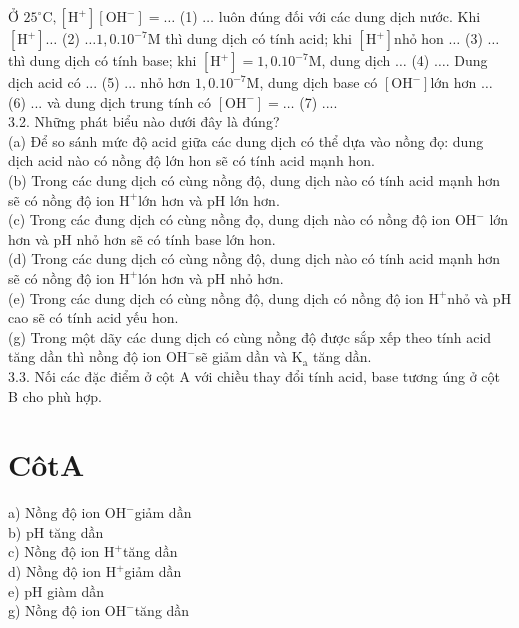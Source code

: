 \documentclass[10pt]{article}
\begin{document}
Ở $25^{\circ} \mathrm{C},\left[\mathrm{H}^{+}\right]\left[\mathrm{OH}^{-}\right]=\ldots$ (1) $\ldots$ luôn đúng đối với các dung dịch nước. Khi $\left[\mathrm{H}^{+}\right] \ldots$ (2) $\ldots 1,0.10^{-7} \mathrm{M}$ thì dung dịch có tính acid; khi $\left[\mathrm{H}^{+}\right]$nhỏ hon $\ldots$ (3) $\ldots$ thì dung dịch có tính base; khi $\left[\mathrm{H}^{+}\right]=1,0.10^{-7} \mathrm{M}$, dung dịch $\ldots$ (4) $\ldots$. Dung dịch acid có ... (5) ... nhỏ hơn $1,0.10^{-7} \mathrm{M}$, dung dịch base có $\left[\mathrm{OH}^{-}\right]$lớn hơn $\ldots$ (6) ... và dung dịch trung tính có $\left[\mathrm{OH}^{-}\right]=\ldots$ (7) ....\\
3.2. Những phát biểu nào dưới đây là đúng?\\
(a) Để so sánh mức độ acid giữa các dung dịch có thể dựa vào nồng đọ: dung dịch acid nào có nồng độ lớn hon sẽ có tính acid mạnh hon.\\
(b) Trong các dung dịch có cùng nồng độ, dung dịch nào có tính acid mạnh hơn sẽ có nồng độ ion $\mathrm{H}^{+}$lớn hơn và pH lớn hơn.\\
(c) Trong các đung dịch có cùng nồng đọ, dung dịch nào có nồng độ ion $\mathrm{OH}^{-}$ lớn hơn và pH nhỏ hơn sẽ có tính base lớn hon.\\
(d) Trong các dung dịch có cùng nồng độ, dung dịch nào có tính acid mạnh hơn sẽ có nồng độ ion $\mathrm{H}^{+}$lón hơn và pH nhỏ hơn.\\
(e) Trong các dung dịch có cùng nồng độ, dung dịch có nồng độ ion $\mathrm{H}^{+}$nhỏ và pH cao sẽ có tính acid yếu hon.\\
(g) Trong một dãy các dung dịch có cùng nồng độ được sắp xếp theo tính acid tăng dần thì nồng độ ion $\mathrm{OH}^{-}$sẽ giảm dần và $\mathrm{K}_{\mathrm{a}}$ tăng dần.\\
3.3. Nối các đặc điểm ở cột A với chiều thay đổi tính acid, base tương úng ở cột B cho phù hợp.

\section*{CôtA}
a) Nồng độ ion $\mathrm{OH}^{-}$giảm dần\\
b) pH tăng dần\\
c) Nồng độ ion $\mathrm{H}^{+}$tăng dần\\
d) Nồng độ ion $\mathrm{H}^{+}$giảm dần\\
e) pH giàm dần\\
g) Nồng độ ion $\mathrm{OH}^{-}$tăng dần
\end{document}
